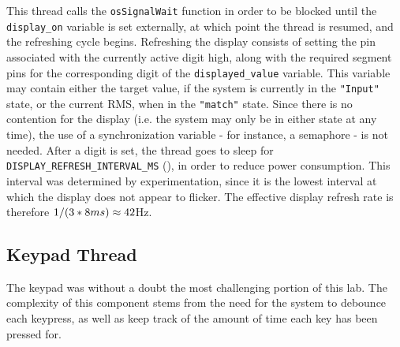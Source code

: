 This thread calls the \verb|osSignalWait| function in order to be blocked until the \verb|display_on| variable is set externally, at which point the thread is resumed, and the refreshing cycle begins. Refreshing the display consists of setting the pin associated with the currently active digit high, along with the required segment pins for the corresponding digit of the \verb|displayed_value| variable. This variable may contain either the target value, if the system is currently in the \verb|"Input"| state, or the current RMS, when in the \verb|"match"| state. Since there is no contention for the display (i.e. the system may only be in either state at any time), the use of a synchronization variable - for instance, a semaphore - is not needed. After a digit is set, the thread goes to sleep for \verb|DISPLAY_REFRESH_INTERVAL_MS| (\DISPLAYREFRESHINTERVAL), in order to reduce power consumption. This interval was determined by experimentation, since it is the lowest interval at which the display does not appear to flicker. The effective display refresh rate is therefore $ 1/(3 * 8ms) \approx 42$Hz.




\subsection{Keypad Thread}


\def \CHECKFORDIGITPRESSINTERVALMS {25ms}
The keypad was without a doubt the most challenging portion of this lab. The complexity of this component stems from the need for the system to debounce each keypress, as well as keep track of the amount of time each key has been pressed for. 


